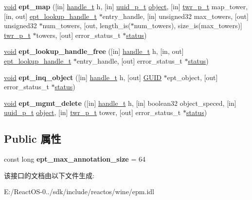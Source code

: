 \begin{DoxyCompactItemize}
\hyperlink{interfacevoid}{void} {\bfseries ept\+\_\+map} (\mbox{[}in\mbox{]} \hyperlink{interfacevoid}{handle\+\_\+t} h, \mbox{[}in\mbox{]} \hyperlink{interface_g_u_i_d}{uuid\+\_\+p\+\_\+t} \hyperlink{structobject}{object}, \mbox{[}in\mbox{]} \hyperlink{structtwr__t}{twr\+\_\+p\+\_\+t} map\+\_\+tower, \mbox{[}in, out\mbox{]} \hyperlink{interfacevoid}{ept\+\_\+lookup\+\_\+handle\+\_\+t} $\ast$entry\+\_\+handle, \mbox{[}in\mbox{]} unsigned32 max\+\_\+towers, \mbox{[}out\mbox{]} unsigned32 $\ast$num\+\_\+towers, \mbox{[}out, length\+\_\+is($\ast$num\+\_\+towers), size\+\_\+is(max\+\_\+towers)\mbox{]} \hyperlink{structtwr__t}{twr\+\_\+p\+\_\+t} $\ast$towers, \mbox{[}out\mbox{]} error\+\_\+status\+\_\+t $\ast$\hyperlink{structstatus}{status})
\item 
\mbox{\label{interfaceepm_aedbb058545bb05be53e6979683ebf83b}} 
\hyperlink{interfacevoid}{void} {\bfseries ept\+\_\+lookup\+\_\+handle\+\_\+free} (\mbox{[}in\mbox{]} \hyperlink{interfacevoid}{handle\+\_\+t} h, \mbox{[}in, out\mbox{]} \hyperlink{interfacevoid}{ept\+\_\+lookup\+\_\+handle\+\_\+t} $\ast$entry\+\_\+handle, \mbox{[}out\mbox{]} error\+\_\+status\+\_\+t $\ast$\hyperlink{structstatus}{status})
\item 
\mbox{\label{interfaceepm_a552fde881f9afc441bc5a4386bb6b2a7}} 
\hyperlink{interfacevoid}{void} {\bfseries ept\+\_\+inq\+\_\+object} (\mbox{[}in\mbox{]} \hyperlink{interfacevoid}{handle\+\_\+t} h, \mbox{[}out\mbox{]} \hyperlink{interface_g_u_i_d}{G\+U\+ID} $\ast$ept\+\_\+object, \mbox{[}out\mbox{]} error\+\_\+status\+\_\+t $\ast$\hyperlink{structstatus}{status})
\item 
\mbox{\label{interfaceepm_ade4c49e39130c88178a95645e2704565}} 
\hyperlink{interfacevoid}{void} {\bfseries ept\+\_\+mgmt\+\_\+delete} (\mbox{[}in\mbox{]} \hyperlink{interfacevoid}{handle\+\_\+t} h, \mbox{[}in\mbox{]} boolean32 object\+\_\+speced, \mbox{[}in\mbox{]} \hyperlink{interface_g_u_i_d}{uuid\+\_\+p\+\_\+t} \hyperlink{structobject}{object}, \mbox{[}in\mbox{]} \hyperlink{structtwr__t}{twr\+\_\+p\+\_\+t} tower, \mbox{[}out\mbox{]} error\+\_\+status\+\_\+t $\ast$\hyperlink{structstatus}{status})
\end{DoxyCompactItemize}
\subsection*{Public 属性}
\begin{DoxyCompactItemize}
\item 
\mbox{\label{interfaceepm_a3ff45d19ac6e785dcc783bdaf69a29e1}} 
const long {\bfseries ept\+\_\+max\+\_\+annotation\+\_\+size} = 64
\end{DoxyCompactItemize}


该接口的文档由以下文件生成\+:\begin{DoxyCompactItemize}
\item 
E\+:/\+React\+O\+S-\/0../sdk/include/reactos/wine/epm.\+idl\end{DoxyCompactItemize}

